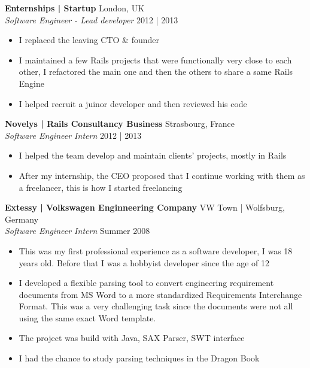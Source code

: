 \documentclass[a4paper]{article}
\begin{document}
\textbf{Enternships | Startup} \hfill London, UK\\
\textit{Software Engineer - Lead developer} \hfill 2012 | 2013\\
\vspace{-1mm}
\begin{itemize} \itemsep 1pt
    \item I replaced the leaving CTO \& founder
    \item I maintained a few Rails projects that were functionally very close to each other,
        I refactored the main one and then the others to share a same Rails Engine
    \item I helped recruit a juinor developer and then reviewed his code
\end{itemize}

\textbf{Novelys | Rails Consultancy Business} \hfill Strasbourg, France\\
\textit{Software Engineer Intern} \hfill 2012 | 2013\\
\vspace{-1mm}
\begin{itemize} \itemsep 1pt
    \item I helped the team develop and maintain clients' projects, mostly in Rails
    \item After my internship, the CEO proposed that I continue working with them as a freelancer, 
        this is how I started freelancing
\end{itemize}

\textbf{Extessy | Volkswagen Enginneering Company} \hfill VW Town | Wolfsburg, Germany\\
\textit{Software Engineer Intern} \hfill Summer 2008\\
\vspace{-1mm}
\begin{itemize} \itemsep 1pt
    \item This was my first professional experience as a software developer, I was 18 years old.
        Before that I was a hobbyist developer since the age of 12
    \item I developed a flexible parsing tool to convert engineering requirement
        documents from MS Word to a more standardized Requirements Interchange Format.
        This was a very challenging task since the documents were not all using
        the same exact Word template.
    \item The project was build with Java, SAX Parser, SWT interface
    \item I had the chance to study parsing techniques in the Dragon Book
\end{itemize}
\end{document}
